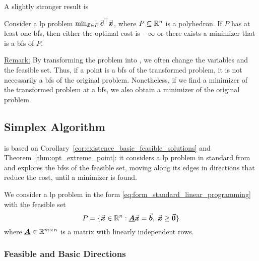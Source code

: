A slightly stronger result is
\begin{theorem}\label{thm:opt_extreme_point_stronger}
Consider a \gls{lp} problem \(\min_{\vec{\boldsymbol{x}}\in P} \vec{\boldsymbol{c}}^\top \vec{\boldsymbol{x}}\), where \(P\subseteq\mathbb{R}^{n}\) is a polyhedron.
If \(P\) has at least one \gls{bfs},
then either the optimal cost is \(-\infty\) or there exists a minimizer that is a \gls{bfs} of \(P\).
\end{theorem}

\underline{Remark:}
By transforming the problem into , we often change the variables and the feasible set.
Thus, if a point is a \gls{bfs} of the transformed problem, it is not necessarily a \gls{bfs} of the original problem.
Nonetheless, if we find a minimizer of the transformed problem at a \gls{bfs}, we also obtain a minimizer of the original problem.












\subsection{Simplex Algorithm}\label{sec:simplex_algorithm_linear_programming}
is based on Corollary~\ref{cor:existence_basic_feasible_solutions} and Theorem~\ref{thm:opt_extreme_point}: 
it considers a \gls{lp} problem in standard from and explores the \glspl{bfs} of the feasible set, moving along its edges in directions that reduce the cost, until a minimizer is found.




We consider a \gls{lp} problem in the form \eqref{eq:form_standard_linear_programming} with the feasible set
\begin{equation}\label{eq:feasible_set_standard_linear_programming}
P = \{\vec{\boldsymbol{x}}\in\mathbb{R}^{n} : \underline{\boldsymbol{A}}\vec{\boldsymbol{x}}=\vec{\boldsymbol{b}},\;\vec{\boldsymbol{x}}\ge \vec{\boldsymbol{0}}\}
\end{equation}
where \(\underline{\boldsymbol{A}}\in\mathbb{R}^{m\times n}\) is a matrix with linearly independent rows.

\subsubsection{Feasible and Basic Directions}



